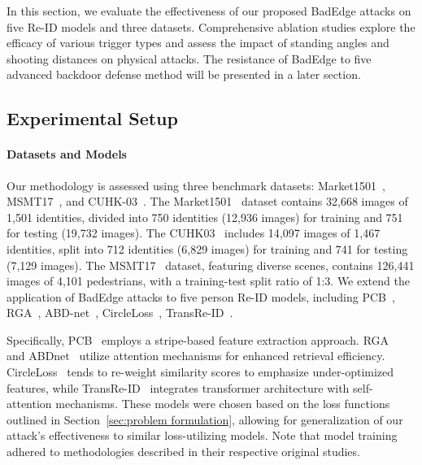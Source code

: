 \documentclass[sigconf,authordraft]{acmart}
\begin{document}
In this section, we evaluate the effectiveness of our proposed BadEdge attacks on five Re-ID models and three datasets. Comprehensive ablation studies explore the efficacy of various trigger types and assess the impact of standing angles and shooting distances on physical attacks. The resistance of BadEdge to five advanced backdoor defense method will be presented in a later section.


\subsection{Experimental Setup}\label{sec:experimental setup}
\paragraph{Datasets and Models}
Our methodology is assessed using three benchmark datasets: Market1501~\cite{zhang2017alignedreid}, MSMT17~\cite{wei2018person}, and CUHK-03~\cite{li2014deepreid}. The Market1501~\cite{zhang2017alignedreid} dataset contains 32,668 images of 1,501 identities, divided into 750 identities (12,936 images) for training and 751 for testing (19,732 images).
The CUHK03~\cite{li2014deepreid} includes 14,097 images of 1,467 identities, split into 712 identities (6,829 images) for training and 741 for testing (7,129 images).
The MSMT17~\cite{wei2018person} dataset, featuring diverse scenes, contains 126,441 images of 4,101 pedestrians, with a training-test split ratio of 1:3.
We extend the application of BadEdge attacks to five person Re-ID models, including PCB~\cite{sun2018beyond}, RGA~\cite{zhang2020relation}, ABD-net~\cite{chen2019abd}, CircleLoss~\cite{sun2020circle}, TransRe-ID~\cite{he2021transreid}.

Specifically, PCB~\cite{sun2018beyond} employs a stripe-based feature extraction approach. RGA~\cite{zhang2020relation} and ABDnet~\cite{chen2019abd} utilize attention mechanisms for enhanced retrieval efficiency. CircleLoss~\cite{sun2020circle} tends to re-weight similarity scores to emphasize under-optimized features, while TransRe-ID~\cite{he2021transreid} integrates transformer architecture with self-attention mechanisms. These models were chosen based on the loss functions outlined in Section~\ref{sec:problem formulation}, allowing for generalization of our attack's effectiveness to similar loss-utilizing models. Note that model training adhered to methodologies described in their respective original studies.
\end{document}
